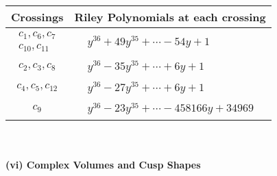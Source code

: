 \documentclass[1p]{elsarticle_modified}
\theoremstyle{definition}
\begin{document}
\begin{tabular}{m{50pt}|m{274pt}}
Crossings & \hspace{64pt}Riley Polynomials at each crossing \\
\hline $$\begin{aligned}c_{1},c_{6},c_{7}\\c_{10},c_{11}\end{aligned}$$&$\begin{aligned}
&y^{36}+49 y^{35}+\cdots-54 y+1
\end{aligned}$\\
\hline $$\begin{aligned}c_{2},c_{3},c_{8}\end{aligned}$$&$\begin{aligned}
&y^{36}-35 y^{35}+\cdots+6 y+1
\end{aligned}$\\
\hline $$\begin{aligned}c_{4},c_{5},c_{12}\end{aligned}$$&$\begin{aligned}
&y^{36}-27 y^{35}+\cdots+6 y+1
\end{aligned}$\\
\hline $$\begin{aligned}c_{9}\end{aligned}$$&$\begin{aligned}
&y^{36}-23 y^{35}+\cdots-458166 y+34969
\end{aligned}$\\
\hline
\end{tabular}\\~\\
\newpage\flushleft \textbf{(vi) Complex Volumes and Cusp Shapes}
\end{document}
